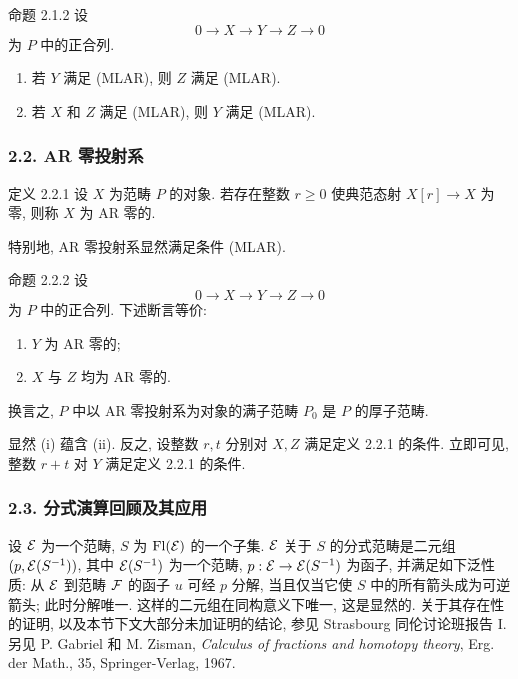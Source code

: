 \begin{statement}{命题 2.1.2}
设
\[
0\longrightarrow X\longrightarrow Y\longrightarrow Z\longrightarrow0
\]
为 $P$ 中的正合列.
\begin{enumerate}[label=(\roman*)]
\item 若 $Y$ 满足 (MLAR), 则 $Z$ 满足 (MLAR).
\item 若 $X$ 和 $Z$ 满足 (MLAR), 则 $Y$ 满足 (MLAR).
\end{enumerate}
\end{statement}

\subsubsection*{2.2. AR 零投射系}
\begin{statement}{定义 2.2.1}
设 $X$ 为范畴 $P$ 的对象. 若存在整数 $r\ge0$ 使典范态射 $X[r]\to X$ 为零, 则称 $X$ 为 AR 零的.
\end{statement}
特别地, AR 零投射系显然满足条件 (MLAR).

\begin{statement}{命题 2.2.2}
设
\[
0\longrightarrow X\longrightarrow Y\longrightarrow Z\longrightarrow0
\]
为 $P$ 中的正合列. 下述断言等价:
\begin{enumerate}[label=(\roman*)]
\item $Y$ 为 AR 零的;
\item $X$ 与 $Z$ 均为 AR 零的.
\end{enumerate}
换言之, $P$ 中以 AR 零投射系为对象的满子范畴 $P_0$ 是 $P$ 的厚子范畴.
\end{statement}

\begin{prooftext}[证明]
显然 (i) 蕴含 (ii). 反之, 设整数 $r,t$ 分别对 $X,Z$ 满足定义 2.2.1 的条件. 立即可见, 整数 $r+t$ 对 $Y$ 满足定义 2.2.1 的条件.
\end{prooftext}

\subsubsection*{2.3. 分式演算回顾及其应用}
设 $\mathcal E$ 为一个范畴, $S$ 为 $\operatorname{Fl}(\mathcal E)$ 的一个子集. $\mathcal E$ 关于 $S$ 的分式范畴是二元组 $(p,\mathcal E(S^{-1}))$, 其中 $\mathcal E(S^{-1})$ 为一个范畴, $p:\mathcal E\to\mathcal E(S^{-1})$ 为函子, 并满足如下泛性质: 从 $\mathcal E$ 到范畴 $\mathcal F$ 的函子 $u$ 可经 $p$ 分解, 当且仅当它使 $S$ 中的所有箭头成为可逆箭头; 此时分解唯一. 这样的二元组在同构意义下唯一, 这是显然的. 关于其存在性的证明, 以及本节下文大部分未加证明的结论, 参见 Strasbourg 同伦讨论班报告 I. 另见 P. Gabriel 和 M. Zisman, \emph{Calculus of fractions and homotopy theory}, Erg. der Math., 35, Springer-Verlag, 1967.

